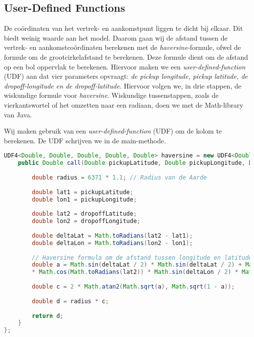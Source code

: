 \documentclass[a4paper,10pt,twoside]{report}
\begin{document}
\newpage

\subsection*{User-Defined Functions}

De coördinaten van het vertrek- en aankomstpunt liggen te dicht bij elkaar. Dit biedt weinig waarde aan het model. Daarom gaan wij de afstand tussen de vertrek- en aankomstcoördinaten berekenen met de \textit{haversine}-formule, ofwel de formule om de grootcirkelafstand te berekenen. Deze formule dient om de afstand op een bol oppervlak te berekenen. Hiervoor maken we een \textit{user-defined-function} (UDF) aan dat vier parameters opvraagt: \textit{de pickup longitude, pickup latitude, de dropoff-longitude en de dropoff-latitude}. Hiervoor volgen we, in drie stappen, de wiskundige formule voor \textit{haversine}. Wiskundige tussenstappen, zoals de vierkantswortel of het omzetten naar een radiaan, doen we met de Math-library van Java.

Wij maken gebruik van een \textit{user-defined-function} (UDF) om de kolom te berekenen. De UDF schrijven we in de main-methode.

\begin{lstlisting}[language=Java]
UDF4<Double, Double, Double, Double, Double> haversine = new UDF4<Double, Double, Double, Double, Double>() {
	public Double call(Double pickupLatitude, Double pickupLongitude, Double dropoffLatitude, Double dropoffLongitude) throws Exception {
		
		double radius = 6371 * 1.1; // Radius van de Aarde
		
		double lat1 = pickupLatitude;
		double lon1 = pickupLongitude;
		
		double lat2 = dropoffLatitude;
		double lon2 = dropoffLongitude;
		
		double deltaLat = Math.toRadians(lat2 - lat1);
		double deltaLon = Math.toRadians(lon2 - lon1);
		
		// Haversine formula om de afstand tussen longitude en latitude te berekenen.
		double a = Math.sin(deltaLat / 2) * Math.sin(deltaLat / 2) + Math.cos(Math.toRadians(lat1))
		* Math.cos(Math.toRadians(lat2)) * Math.sin(deltaLon / 2) * Math.sin(deltaLon / 2);
		
		double c = 2 * Math.atan2(Math.sqrt(a), Math.sqrt(1 - a));
		
		double d = radius * c;
		
		return d;
	}
};
\end{lstlisting}
\end{document}
